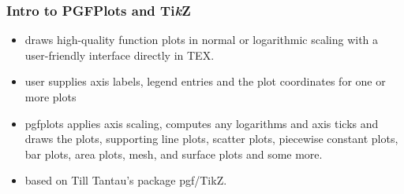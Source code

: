\documentclass{beamer}
\begin{document}
\begin{frame}\frametitle{Intro to PGFPlots and Ti\emph{k}Z}

\begin{itemize}
	\item 
draws high-quality function plots in normal or logarithmic scaling with a user-friendly
interface directly in TEX. 
\item user supplies axis labels, legend entries and the plot coordinates for one
or more plots 
\item pgfplots applies axis scaling, computes any logarithms and axis ticks and draws
the plots, supporting line plots, scatter plots, piecewise constant plots, bar plots, area plots, mesh, and
surface plots and some more. 
\item based on Till Tantau's package pgf/TikZ.
\end{itemize}
\end{frame}

\noindent

\begin{frame}[fragile]

\tiny


\end{frame}

\frame{

}



\frame{
\begin{tikzpicture}
\begin{axis}[
axis equal=true,
axis x line=middle,
axis y line=middle]
]
\addplot[mark=none,smooth,domain=-1.5:1.5] {x^2*(abs(x)<0.5) + (0.5^2 + 2*0.5*(abs(x)-0.5))*(1-(abs(x)<0.5))};
\end{axis}
\end{tikzpicture}
}
\end{document}
